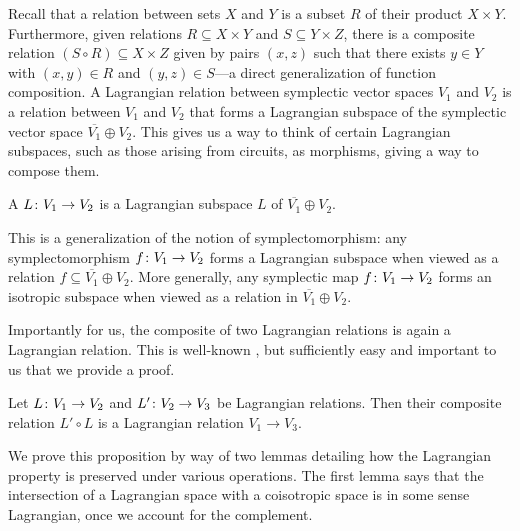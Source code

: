 Recall that a relation between sets $X$ and $Y$ is a subset $R$ of their product
$X \times Y$. Furthermore, given relations $R \subseteq X \times Y$ and $S
\subseteq Y \times Z$, there is a composite relation $(S \circ R) \subseteq X
\times Z$ given by pairs $(x,z)$ such that there exists $y \in Y$ with $(x,y)
\in R$ and $(y,z) \in S$---a direct generalization of function composition. A
Lagrangian relation between symplectic vector spaces $V_1$ and $V_2$ is a
relation between $V_1$ and $V_2$ that forms a Lagrangian subspace of the
symplectic vector space $\overline{V_1} \oplus V_2$. This gives us a
way to think of certain Lagrangian subspaces, such as those arising from
circuits, as morphisms, giving a way to compose them.

\begin{definition}
  A  $L{\colon} V_1 \to V_2$ is a Lagrangian subspace $L$
  of $\overline{V_1} \oplus V_2$. 
\end{definition}

This is a generalization of the notion of symplectomorphism: any symplectomorphism
$f{\colon} V_1 \to V_2$ forms a Lagrangian subspace when viewed as a
relation $f \subseteq \overline{V_1} \oplus V_2$. More generally, any symplectic
map $f{\colon} V_1 \to V_2$ forms an isotropic subspace when viewed as a relation in
$\overline{V_1} \oplus V_2$. 

Importantly for us, the composite of two Lagrangian relations is again a
Lagrangian relation.  This is well-known \cite{Weinstein}, but sufficiently 
easy and important to us that we provide a proof.

\begin{proposition} \label{prop:lagrangian_composition}
  Let $L{\colon} V_1 \to V_2$ and $L'{\colon} V_2 \to V_3$ be Lagrangian relations. Then their
  composite relation $L' \circ L$ is a Lagrangian relation $V_1 \to V_3$.
\end{proposition}

We prove this proposition by way of two lemmas detailing how the Lagrangian
property is preserved under various operations. The first lemma says that the
intersection of a Lagrangian space with a coisotropic space is in some sense
Lagrangian, once we account for the complement.

